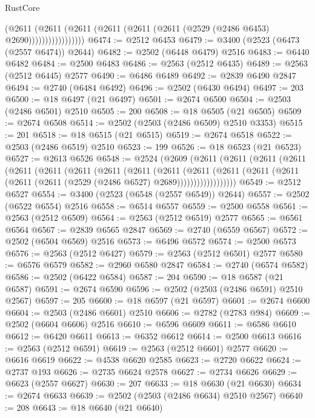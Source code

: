 \begin{lexlean}{RustCore}
\begin{coremodule}
                        (@2611
                          (@2611
                            (@2611 (@2611 (@2611 (@2611 (@2529 (@2486 @6453) @2690)))))))))))))))))
@6474 := @2512 @6453
@6479 := @3400 (@2523 (@6473 (@2557 @6474)) @2644)
@6482 := @2502 (@6448 @6479) @2516
@6483 := @6440 @6482
@6484 := @2500 @6483
@6486 := @2563 (@2512 @6435)
@6489 := @2563 (@2512 @6445) @2577
@6490 := @6486 @6489
@6492 := @2839 @6490 @2847
@6494 := @2740 (@6484 @6492)
@6496 := @2502 (@6430 @6494)
@6497 := 203
@6500 := @18 @6497 (@21 @6497)
@6501 := @2674 @6500
@6504 := @2503 (@2486 @6501) @2510
@6505 := 200
@6508 := @18 @6505 (@21 @6505)
@6509 := @2674 @6508
@6514 := @2502 (@2503 (@2486 @6509) @2510 @3353)
@6515 := 201
@6518 := @18 @6515 (@21 @6515)
@6519 := @2674 @6518
@6522 := @2503 (@2486 @6519) @2510
@6523 := 199
@6526 := @18 @6523 (@21 @6523)
@6527 := @2613 @6526
@6548 := @2524
    (@2609
      (@2611
        (@2611
          (@2611
            (@2611
              (@2611
                (@2611
                  (@2611
                    (@2611
                      (@2611
                        (@2611
                          (@2611
                            (@2611
                              (@2611
                                (@2611 (@2611 (@2611 (@2529 (@2486 @6527) @2689))))))))))))))))))
@6549 := @2512 @6527
@6554 := @3400 (@2523 (@6548 (@2557 @6549)) @2644)
@6557 := @2502 (@6522 @6554) @2516
@6558 := @6514 @6557
@6559 := @2500 @6558
@6561 := @2563 (@2512 @6509)
@6564 := @2563 (@2512 @6519) @2577
@6565 := @6561 @6564
@6567 := @2839 @6565 @2847
@6569 := @2740 (@6559 @6567)
@6572 := @2502 (@6504 @6569) @2516
@6573 := @6496 @6572
@6574 := @2500 @6573
@6576 := @2563 (@2512 @6427)
@6579 := @2563 (@2512 @6501) @2577
@6580 := @6576 @6579
@6582 := @2960 @6580 @2847
@6584 := @2740 (@6574 @6582)
@6586 := @2502 (@6422 @6584)
@6587 := 204
@6590 := @18 @6587 (@21 @6587)
@6591 := @2674 @6590
@6596 := @2502 (@2503 (@2486 @6591) @2510 @2567)
@6597 := 205
@6600 := @18 @6597 (@21 @6597)
@6601 := @2674 @6600
@6604 := @2503 (@2486 @6601) @2510
@6606 := @2782 (@2783 @984)
@6609 := @2502 (@6604 @6606) @2516
@6610 := @6596 @6609
@6611 := @6586 @6610
@6612 := @6420 @6611
@6613 := @6352 @6612
@6614 := @2500 @6613
@6616 := @2563 (@2512 @6591)
@6619 := @2563 (@2512 @6601) @2577
@6620 := @6616 @6619
@6622 := @4538 @6620 @2585
@6623 := @2720 @6622
@6624 := @2737 @193
@6626 := @2735 @6624 @2578
@6627 := @2734 @6626
@6629 := @6623 (@2557 @6627)
@6630 := 207
@6633 := @18 @6630 (@21 @6630)
@6634 := @2674 @6633
@6639 := @2502 (@2503 (@2486 @6634) @2510 @2567)
@6640 := 208
@6643 := @18 @6640 (@21 @6640)

\end{coremodule}
\end{lexlean}
